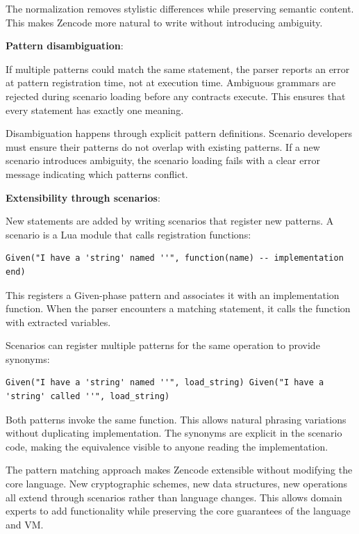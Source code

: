 The normalization removes stylistic differences while preserving
semantic content. This makes Zencode more natural to write without
introducing ambiguity.

\textbf{Pattern disambiguation}:

If multiple patterns could match the same statement, the parser
reports an error at pattern registration time, not at execution
time. Ambiguous grammars are rejected during scenario loading before
any contracts execute. This ensures that every statement has exactly
one meaning.

Disambiguation happens through explicit pattern definitions. Scenario
developers must ensure their patterns do not overlap with existing
patterns. If a new scenario introduces ambiguity, the scenario loading
fails with a clear error message indicating which patterns conflict.

\textbf{Extensibility through scenarios}:

New statements are added by writing scenarios that register new
patterns. A scenario is a Lua module that calls registration
functions:

\begin{verbatim}
Given("I have a 'string' named ''", function(name) -- implementation
end)
\end{verbatim}

This registers a Given-phase pattern and associates it with an
implementation function. When the parser encounters a matching
statement, it calls the function with extracted variables.

Scenarios can register multiple patterns for the same operation to
provide synonyms:

\begin{verbatim}
Given("I have a 'string' named ''", load_string) Given("I have a
'string' called ''", load_string)
\end{verbatim}

Both patterns invoke the same function. This allows natural phrasing
variations without duplicating implementation. The synonyms are
explicit in the scenario code, making the equivalence visible to
anyone reading the implementation.

The pattern matching approach makes Zencode extensible without
modifying the core language. New cryptographic schemes, new data
structures, new operations all extend through scenarios rather than
language changes. This allows domain experts to add functionality
while preserving the core guarantees of the language and VM.

